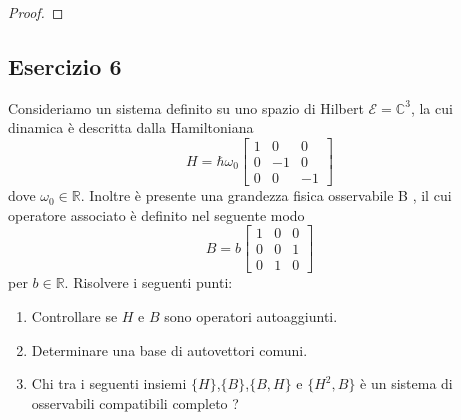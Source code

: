 \begin{proof}
\end{proof}

\subsection{Esercizio 6}

Consideriamo un sistema definito su uno spazio di Hilbert $\mathcal{E} = \mathbb{C}^3$, la cui dinamica \`e descritta dalla Hamiltoniana
\begin{equation*}
	H = \hbar \omega_0\left [ \begin{array}{ccc}
		1 & 0 & 0\\
		0 & -1 & 0 \\
		0 & 0 & -1
	\end{array}\right]
\end{equation*} 
dove $\omega_0 \in \mathbb{R}$. Inoltre \`e presente una grandezza fisica osservabile B , il cui operatore associato \`e definito nel seguente modo
\begin{equation*}
	B = b\left [ \begin{array}{ccc}
		1 & 0 & 0\\
		0 & 0 & 1 \\
		0 & 1 & 0
	\end{array}\right]
\end{equation*}
per $b \in \mathbb{R}$. Risolvere i seguenti punti:
\begin{enumerate}
	\item Controllare se $H$ e $B$ sono operatori autoaggiunti.
	\item Determinare una base di autovettori comuni.
	\item Chi tra i seguenti insiemi $\{H\}$,$\{B\}$,$\{B,H\}$ e $\{H^2,B\}$ \`e un sistema di osservabili compatibili completo ? 
\end{enumerate}

